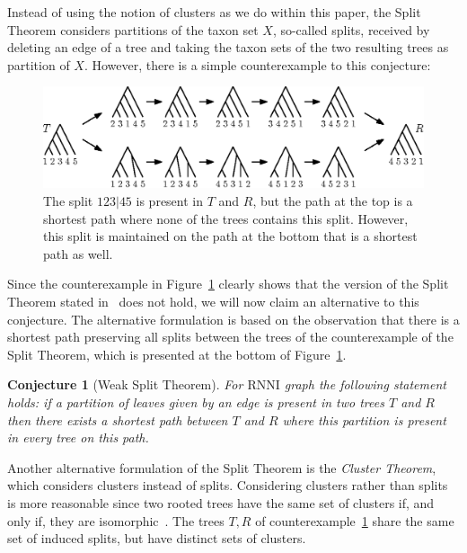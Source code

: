 \documentclass[11pt, a4paper]{article}
\newcommand{\rnni}{\mathrm{RNNI}}
\newtheorem{conjecture}[definition]{Conjecture}
\begin{document}
Instead of using the notion of clusters as we do within this paper, the Split Theorem considers partitions of the taxon set $X$, so-called splits, received by deleting an edge of a tree and taking the taxon sets of the two resulting trees as partition of $X$.
However, there is a simple counterexample to this conjecture:

\begin{figure}[H]
	\centering
	\includegraphics[width=\textwidth]{splitthm_counterexample}
	\caption{The split $123|45$ is present in $T$ and $R$, but the path at the top is a shortest path where none of the trees contains this split.
    However, this split is maintained on the path at the bottom that is a shortest path as well.}
	\label{splitthm_counterexample}
\end{figure}

Since the counterexample in Figure~\ref{splitthm_counterexample} clearly shows that the version of the Split Theorem stated in~\cite{Gavryushkin2017} does not hold, we will now claim an alternative to this conjecture.
The alternative formulation is based on the observation that there is a shortest path preserving all splits between the trees of the counterexample of the Split Theorem, which is presented at the bottom of Figure~\ref{splitthm_counterexample}.


\begin{conjecture}[Weak Split Theorem]
	For $\rnni$ graph the following statement holds:
	if a partition of leaves given by an edge is present in two trees $T$ and $R$ then there exists a shortest path between $T$ and $R$ where this partition is present in every tree on this path.
	\label{split_theorem_weak}
\end{conjecture}



Another alternative formulation of the Split Theorem is the \emph{Cluster Theorem}, which considers clusters instead of splits.
Considering clusters rather than splits is more reasonable since two rooted trees have the same set of clusters if, and only if, they are isomorphic~\cite{steel2016}.
The trees $T, R$ of counterexample~\ref{splitthm_counterexample} share the same set of induced splits, but have distinct sets of clusters.
\end{document}
